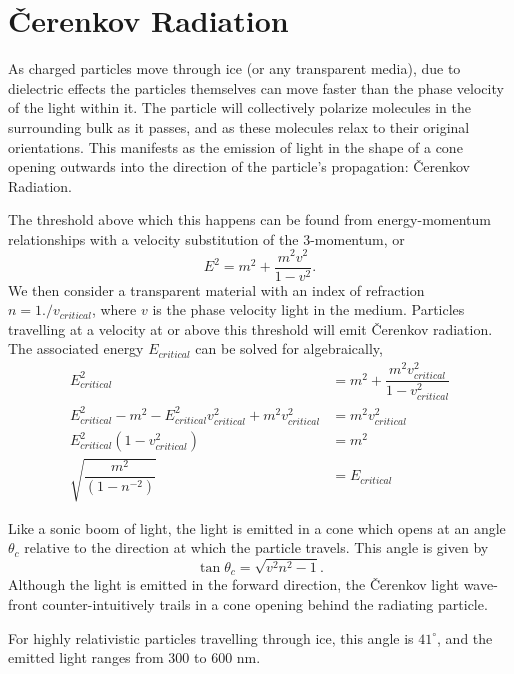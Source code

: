 \documentclass[main.tex]{subfiles}
\begin{document}
\section{\v{C}erenkov Radiation}

As charged particles move through ice (or any transparent media), due to dielectric effects the particles themselves can move faster than the phase velocity of the light within it. 
The particle will collectively polarize molecules in the surrounding bulk as it passes, and as these molecules relax to their original orientations. 
This manifests as the emission of light in the shape of a cone opening outwards into the direction of the particle's propagation: \v{C}erenkov Radiation. 

The threshold above which this happens can be found from energy-momentum relationships with a velocity substitution of the 3-momentum, or 
\begin{equation}
    E^{2} = m^{2} + \dfrac{m^{2}v^{2}}{1-v^{2}}.
\end{equation}
We then consider a transparent material with an index of refraction $n = 1./v_{critical}$, where $v$ is the phase velocity light in the medium. 
Particles travelling at a velocity at or above this threshold will emit \v{C}erenkov radiation. 
The associated energy $E_{critical}$ can be solved for algebraically,
\begin{align}
        E^{2}_{critical} &= m^{2} + \dfrac{m^{2}v_{critical}^{2}}{1-v_{critical}^{2}} \\
        E^{2}_{critical}  - m^{2} - E^{2}_{critical}v_{critical}^{2}  + m^{2}v_{critical}^{2} &= m^{2}v_{critical}^{2} \\
        E^{2}_{critical}\left(1  -v_{critical}^{2}\right) &=  m^{2} \\
        \sqrt{\dfrac{m^{2}}{\left(1  -n^{-2}\right)}} &= E_{critical} 
\end{align}

Like a sonic boom of light, the light is emitted in a cone which opens at an angle $\theta_{c}$ relative to the direction at which the particle travels. 
This angle is given by
\begin{equation}
\tan\theta_{c} = \sqrt{v^{2}n^{2} - 1} .
\end{equation}
Although the light is emitted in the forward direction, the \v{C}erenkov light wave-front counter-intuitively trails in a cone opening behind the radiating particle. 

For highly relativistic particles travelling through ice, this angle is $41^{\circ}$, and the emitted light ranges from 300 to 600 nm. 
\end{document}
